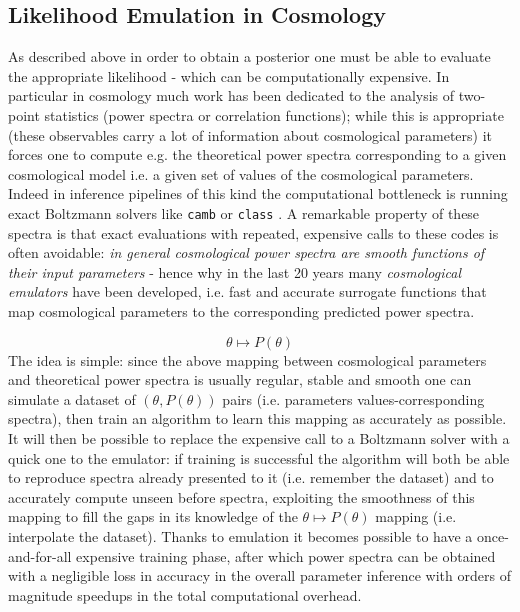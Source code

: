 \subsection{Likelihood Emulation in Cosmology}
As described above in order to obtain a posterior one must be able to evaluate the appropriate likelihood - which can be computationally expensive. In particular in cosmology much work has been dedicated to the analysis of two-point statistics (power spectra or correlation functions); while this is appropriate (these observables carry a lot of information about cosmological parameters) it forces one to compute e.g. the theoretical power spectra corresponding to a given cosmological model i.e. a given set of values of the cosmological parameters. Indeed in inference pipelines of this kind the computational bottleneck is running exact Boltzmann solvers like \texttt{camb} \cite{camb} or \texttt{class} \cite{class_1} \cite{class_2}. A remarkable property of these spectra is that exact evaluations with repeated, expensive calls to these codes is often avoidable: \emph{in general cosmological power spectra are smooth functions of their input parameters} - hence why in the last 20 years many \emph{cosmological emulators} have been developed, i.e. fast and accurate surrogate functions that map cosmological parameters to the corresponding predicted power spectra.

\begin{equation*}
    \theta \mapsto P(\theta)
\end{equation*}
The idea is simple: since the above mapping between cosmological parameters and theoretical power spectra is usually regular, stable and smooth one can simulate a dataset of $(\theta, P(\theta))$ pairs (i.e. parameters values-corresponding spectra), then train an algorithm to learn this mapping as accurately as possible. It will then be possible to replace the expensive call to a Boltzmann solver with a quick one to the emulator: if training is successful the algorithm will both be able to reproduce spectra already presented to it (i.e. remember the dataset) and to accurately compute unseen before spectra, exploiting the smoothness of this mapping to fill the gaps in its knowledge of the $\theta \mapsto P(\theta)$ mapping (i.e. interpolate the dataset).
Thanks to emulation it becomes possible to have a once-and-for-all expensive training phase, after which power spectra can be obtained with a negligible loss in accuracy in the overall parameter inference with orders of magnitude speedups in the total computational overhead. 

